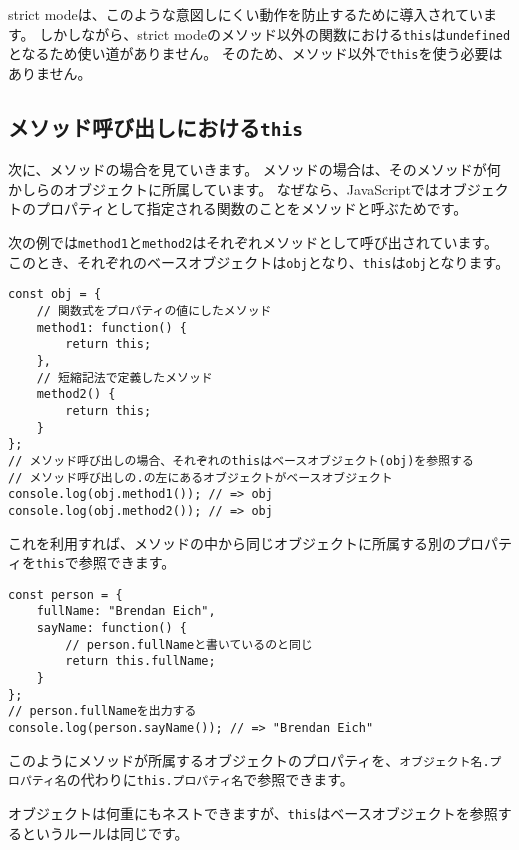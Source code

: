 strict
modeは、このような意図しにくい動作を防止するために導入されています。
しかしながら、strict
modeのメソッド以外の関数における\texttt{this}は\texttt{undefined}となるため使い道がありません。
そのため、メソッド以外で\texttt{this}を使う必要はありません。

\hypertarget{method-this}{%
\subsection{\texorpdfstring{メソッド呼び出しにおける\texttt{this}}{メソッド呼び出しにおけるthis}}\label{method-this}}

次に、メソッドの場合を見ていきます。
メソッドの場合は、そのメソッドが何かしらのオブジェクトに所属しています。
なぜなら、JavaScriptではオブジェクトのプロパティとして指定される関数のことをメソッドと呼ぶためです。

次の例では\texttt{method1}と\texttt{method2}はそれぞれメソッドとして呼び出されています。
このとき、それぞれのベースオブジェクトは\texttt{obj}となり、\texttt{this}は\texttt{obj}となります。

\begin{lstlisting}
const obj = {
    // 関数式をプロパティの値にしたメソッド
    method1: function() {
        return this;
    },
    // 短縮記法で定義したメソッド
    method2() {
        return this;
    }
};
// メソッド呼び出しの場合、それぞれのthisはベースオブジェクト(obj)を参照する
// メソッド呼び出しの.の左にあるオブジェクトがベースオブジェクト
console.log(obj.method1()); // => obj
console.log(obj.method2()); // => obj
\end{lstlisting}

これを利用すれば、メソッドの中から同じオブジェクトに所属する別のプロパティを\texttt{this}で参照できます。

\begin{lstlisting}
const person = {
    fullName: "Brendan Eich",
    sayName: function() {
        // person.fullNameと書いているのと同じ
        return this.fullName;
    }
};
// person.fullNameを出力する
console.log(person.sayName()); // => "Brendan Eich"
\end{lstlisting}

このようにメソッドが所属するオブジェクトのプロパティを、\texttt{オブジェクト名.\hbox{}プロパティ名}の代わりに\texttt{this.\hbox{}プロパティ名}で参照できます。

オブジェクトは何重にもネストできますが、\texttt{this}はベースオブジェクトを参照するというルールは同じです。

